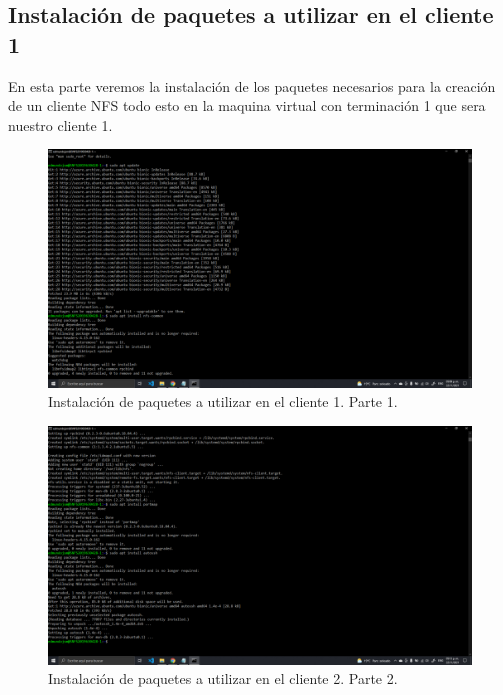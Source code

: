 \documentclass[11pt]{article}
\begin{document}
		\subsection{Instalación de paquetes a utilizar en el cliente 1}
		En esta parte veremos la instalación de los paquetes necesarios para la creación de un cliente NFS todo esto en la maquina virtual con terminación 1 que sera nuestro cliente 1.
		\begin{figure}[H]
			\centering
			\includegraphics[scale=0.34]{resources/instalandocliente1.1.png}
			\caption{Instalación de paquetes a utilizar en el cliente 1. Parte 1.}\label{fig:picture}
		\end{figure}
		\begin{figure}[H]
			\centering
			\includegraphics[scale=0.34]{resources/instalandocliente1.2.png}
			\caption{Instalación de paquetes a utilizar en el cliente 2. Parte 2.}\label{fig:picture}
		\end{figure}
\end{document}
